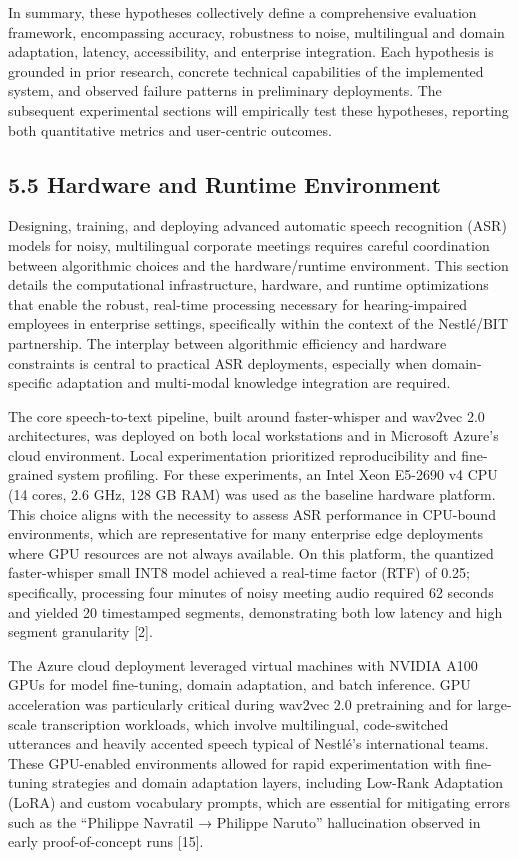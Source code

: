 \documentclass[12pt,a4paper]{article}
\begin{document}
In summary, these hypotheses collectively define a comprehensive evaluation framework, encompassing accuracy, robustness to noise, multilingual and domain adaptation, latency, accessibility, and enterprise integration. Each hypothesis is grounded in prior research, concrete technical capabilities of the implemented system, and observed failure patterns in preliminary deployments. The subsequent experimental sections will empirically test these hypotheses, reporting both quantitative metrics and user-centric outcomes.


\subsection{5.5 Hardware and Runtime Environment}


Designing, training, and deploying advanced automatic speech recognition (ASR) models for noisy, multilingual corporate meetings requires careful coordination between algorithmic choices and the hardware/runtime environment. This section details the computational infrastructure, hardware, and runtime optimizations that enable the robust, real-time processing necessary for hearing-impaired employees in enterprise settings, specifically within the context of the Nestlé/BIT partnership. The interplay between algorithmic efficiency and hardware constraints is central to practical ASR deployments, especially when domain-specific adaptation and multi-modal knowledge integration are required.


The core speech-to-text pipeline, built around faster-whisper and wav2vec 2.0 architectures, was deployed on both local workstations and in Microsoft Azure’s cloud environment. Local experimentation prioritized reproducibility and fine-grained system profiling. For these experiments, an Intel Xeon E5-2690 v4 CPU (14 cores, 2.6 GHz, 128 GB RAM) was used as the baseline hardware platform. This choice aligns with the necessity to assess ASR performance in CPU-bound environments, which are representative for many enterprise edge deployments where GPU resources are not always available. On this platform, the quantized faster-whisper small INT8 model achieved a real-time factor (RTF) of 0.25; specifically, processing four minutes of noisy meeting audio required 62 seconds and yielded 20 timestamped segments, demonstrating both low latency and high segment granularity [2].


The Azure cloud deployment leveraged virtual machines with NVIDIA A100 GPUs for model fine-tuning, domain adaptation, and batch inference. GPU acceleration was particularly critical during wav2vec 2.0 pretraining and for large-scale transcription workloads, which involve multilingual, code-switched utterances and heavily accented speech typical of Nestlé’s international teams. These GPU-enabled environments allowed for rapid experimentation with fine-tuning strategies and domain adaptation layers, including Low-Rank Adaptation (LoRA) and custom vocabulary prompts, which are essential for mitigating errors such as the “Philippe Navratil → Philippe Naruto” hallucination observed in early proof-of-concept runs [15].
\end{document}

